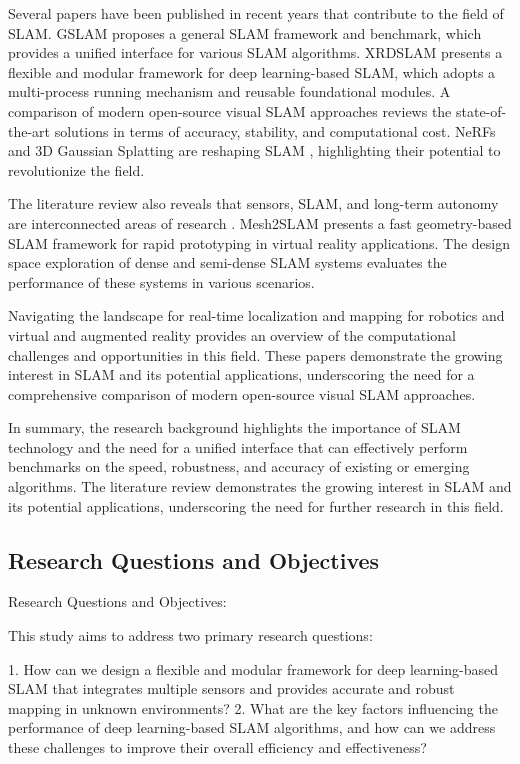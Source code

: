\documentclass[conference]{IEEEtran}
\begin{document}
Several papers have been published in recent years that contribute to the field of SLAM. GSLAM \cite{gslam} proposes a general SLAM framework and benchmark, which provides a unified interface for various SLAM algorithms. XRDSLAM \cite{xrdslam} presents a flexible and modular framework for deep learning-based SLAM, which adopts a multi-process running mechanism and reusable foundational modules. A comparison of modern open-source visual SLAM approaches \cite{comparison} reviews the state-of-the-art solutions in terms of accuracy, stability, and computational cost. NeRFs and 3D Gaussian Splatting are reshaping SLAM \cite{nersplat}, highlighting their potential to revolutionize the field.

The literature review also reveals that sensors, SLAM, and long-term autonomy are interconnected areas of research \cite{sensors}. Mesh2SLAM \cite{mesh} presents a fast geometry-based SLAM framework for rapid prototyping in virtual reality applications. The design space exploration of dense and semi-dense SLAM systems \cite{denselandscape} evaluates the performance of these systems in various scenarios.

Navigating the landscape for real-time localization and mapping for robotics and virtual and augmented reality \cite{landscape} provides an overview of the computational challenges and opportunities in this field. These papers demonstrate the growing interest in SLAM and its potential applications, underscoring the need for a comprehensive comparison of modern open-source visual SLAM approaches.

In summary, the research background highlights the importance of SLAM technology and the need for a unified interface that can effectively perform benchmarks on the speed, robustness, and accuracy of existing or emerging algorithms. The literature review demonstrates the growing interest in SLAM and its potential applications, underscoring the need for further research in this field.

\subsection{Research Questions and Objectives}
Research Questions and Objectives:

This study aims to address two primary research questions:

1. How can we design a flexible and modular framework for deep learning-based SLAM that integrates multiple sensors and provides accurate and robust mapping in unknown environments?
2. What are the key factors influencing the performance of deep learning-based SLAM algorithms, and how can we address these challenges to improve their overall efficiency and effectiveness?
\end{document}
